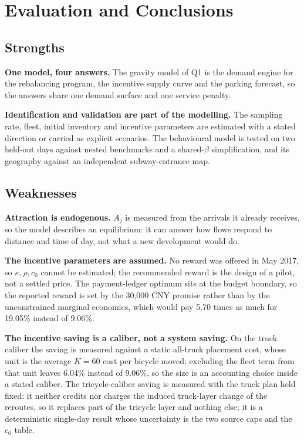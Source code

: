 \section{Evaluation and Conclusions}\label{sec:eval}

\subsection{Strengths}

\textbf{One model, four answers.} The gravity model of Q1 is the demand engine for the
rebalancing program, the incentive supply curve and the parking forecast, so the answers
share one demand surface and one service penalty.

\textbf{Identification and validation are part of the modelling.} The sampling rate,
fleet, initial inventory and incentive parameters are estimated with a stated direction
or carried as explicit scenarios. The behavioural model is tested on two held-out days
against nested benchmarks and a shared-$\beta$ simplification, and its geography against
an independent subway-entrance map.

\subsection{Weaknesses}

\textbf{Attraction is endogenous.} $A_j$ is measured from the arrivals it already
receives, so the model describes an equilibrium: it can answer how flows respond to
distance and time of day, not what a new development would do.

\textbf{The incentive parameters are assumed.} No reward was offered in May 2017, so
$\kappa,\rho,c_0$ cannot be estimated; the recommended reward is the design of a
pilot, not a settled price. The payment-ledger optimum sits at the budget boundary, so
the reported reward is set by the 30,000 CNY promise rather than by the unconstrained
marginal economics, which would pay 5.70 times as much for 19.05\% instead of 9.06\%.

\textbf{The incentive saving is a caliber, not a system saving.} On the truck caliber
the saving is measured against a static all-truck placement cost, whose unit is the
average $K=60$ cost per bicycle moved; excluding the fleet term from that unit leaves
6.04\% instead of 9.06\%, so the size is an accounting choice inside a stated caliber.
The tricycle-caliber saving is measured with the truck plan held fixed: it neither
credits nor charges the induced truck-layer change of the reroutes, so it replaces part
of the tricycle layer and nothing else; it is a deterministic single-day result whose
uncertainty is the two source caps and the $c_0$ table.

